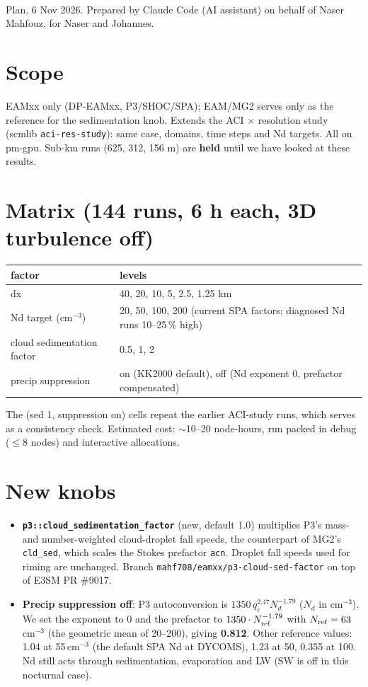 \documentclass[10pt]{article}
\begin{document}
\\[2pt]
Plan, 6 Nov 2026. Prepared by Claude Code (AI assistant) on behalf of Naser Mahfouz, for Naser and Johannes.

\section*{Scope}
EAMxx only (DP-EAMxx, P3/SHOC/SPA); EAM/MG2 serves only as the reference for the sedimentation knob.
Extends the ACI $\times$ resolution study (scmlib \texttt{aci-res-study}): same case, domains, time steps and Nd targets.
All on pm-gpu. Sub-km runs (625, 312, 156 m) are \textbf{held} until we have looked at these results.

\section*{Matrix (144 runs, 6 h each, 3D turbulence off)}
\begin{tabular}{@{}ll@{}}
\toprule
factor & levels \\ \midrule
dx & 40, 20, 10, 5, 2.5, 1.25 km \\
Nd target (cm$^{-3}$) & 20, 50, 100, 200 (current SPA factors; diagnosed Nd runs 10--25\,\% high) \\
cloud sedimentation factor & 0.5, 1, 2 \\
precip suppression & on (KK2000 default), off (Nd exponent 0, prefactor compensated) \\ \bottomrule
\end{tabular}

\smallskip\noindent The (sed 1, suppression on) cells repeat the earlier ACI-study runs, which serves as a consistency check.
Estimated cost: $\sim$10--20 node-hours, run packed in debug ($\le$8 nodes) and interactive allocations.

\section*{New knobs}
\begin{itemize}
\item \textbf{\texttt{p3::cloud\_sedimentation\_factor}} (new, default 1.0) multiplies P3's mass- and number-weighted
cloud-droplet fall speeds, the counterpart of MG2's \texttt{cld\_sed}, which scales the Stokes prefactor \texttt{acn}.
Droplet fall speeds used for riming are unchanged.
Branch \texttt{mahf708/eamxx/p3-cloud-sed-factor} on top of E3SM PR \#9017.
\item \textbf{Precip suppression off}: P3 autoconversion is $1350\,q_c^{2.47}N_d^{-1.79}$ ($N_d$ in cm$^{-3}$).
We set the exponent to 0 and the prefactor to $1350\cdot N_{\rm ref}^{-1.79}$ with $N_{\rm ref}=63$\,cm$^{-3}$
(the geometric mean of 20--200), giving \textbf{0.812}. Other reference values: 1.04 at 55\,cm$^{-3}$
(the default SPA Nd at DYCOMS), 1.23 at 50, 0.355 at 100.
Nd still acts through sedimentation, evaporation and LW (SW is off in this nocturnal case).
\end{itemize}
\end{document}
